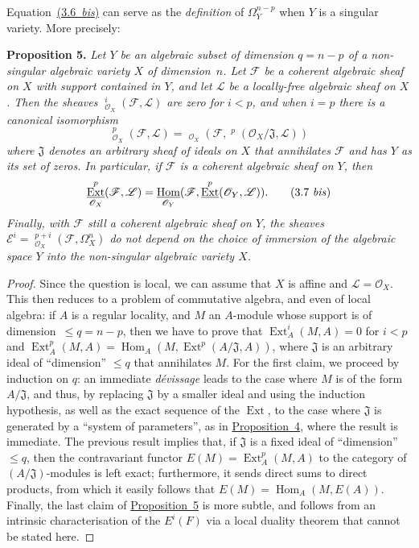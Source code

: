 \documentclass{article}
\newenvironment{itenv}[1]
  {\phantomsection\par\medskip\noindent\textbf{#1.}\itshape}
  {\par\medskip}
\newcommand{\scr}[1]{{\mathscr{#1}}}
\renewcommand{\leq}{\leqslant}
\DeclareMathOperator{\Ext}{Ext}
\DeclareMathOperator{\Hom}{Hom}
\DeclareMathOperator{\shExt}{\underline{Ext}}
\DeclareMathOperator{\shHom}{\underline{Hom}}
\newcommand{\oldpage}[1]{\marginpar{\footnotesize$\Big\vert$ \textit{p.~#1}}}
\begin{document}
Equation~\hyperref[3.6bis]{(3.6~\emph{bis})} can serve as the \emph{definition} of $\Omega_Y^{n-p}$ when $Y$ is a singular variety.
More precisely:

\begin{itenv}{Proposition 5}
\label{proposition5}
  Let $Y$ be an algebraic subset of dimension $q=n-p$ of a non-singular algebraic variety $X$ of dimension~$n$.
  Let $\scr{F}$ be a coherent algebraic sheaf on $X$ with support contained in $Y$, and let $\scr{L}$ be a locally-free algebraic sheaf on $X$.
  Then the sheaves $\shExt_{\scr{O}_X}^i(\scr{F},\scr{L})$ are zero for $i<p$, and when $i=p$ there is a canonical isomorphism
  \[
  \label{3.7}
    \shExt_{\scr{O}_X}^p(\scr{F},\scr{L}) = \shHom_{\scr{O}_X}(\scr{F},\shExt^p(\scr{O}_X/\mathfrak{J},\scr{L}))
  \tag{3.7}
  \]
  where $\mathfrak{J}$ denotes an arbitrary sheaf of ideals on $X$ that annihilates $\scr{F}$ and has $Y$ as its set of zeros.
  In particular, if $\scr{F}$ is a coherent algebraic sheaf on $Y$, then
  \[
  \label{3.7bis}
    \shExt_{\scr{O}_X}^p(\scr{F},\scr{L}) = \shHom_{\scr{O}_Y}(\scr{F},\shExt^p(\scr{O}_Y,\scr{L})).
  \tag{3.7 \emph{bis}}
  \]
  Finally, with $\scr{F}$ still a coherent algebraic sheaf on $Y$, the sheaves $\scr{E}^i=\shExt_{\scr{O}_X}^{p+i}(\scr{F},\Omega_X^n)$ do not depend on the choice of immersion of the algebraic space $Y$ into the non-singular algebraic variety $X$.
\end{itenv}

\begin{proof}
  Since the question is local, we can assume that $X$ is affine and $\scr{L}=\scr{O}_X$.
  This then reduces to a problem of commutative algebra, and even of local algebra:
  if $A$ is a regular locality, and $M$ an $A$-module whose support is of dimension~$\leq q=n-p$, then we have to prove that $\Ext_A^i(M,A)=0$ for $i<p$ and $\Ext_A^p(M,A)=\Hom_A(M,\Ext^p(A/\mathfrak{J},A))$, where $\mathfrak{J}$ is an arbitrary ideal of ``dimension'' $\leq q$ that annihilates $M$.
  For the first claim, we proceed by induction on $q$:
  an immediate \emph{d\'{e}vissage} leads to the case where $M$ is of the form $A/\mathfrak{J}$, and thus, by replacing $\mathfrak{J}$ by a smaller ideal and using the induction hypothesis, as well as the exact sequence of the $\Ext$, to the case where $\mathfrak{J}$ is generated by a ``system of parameters'', as in \hyperref[proposition4]{Proposition~4}, where the result is immediate.
  The previous result implies that, if $\mathfrak{J}$ is a
\oldpage{149-09}
  fixed ideal of ``dimension'' $\leq q$, then the contravariant functor $E(M)=\Ext_A^p(M,A)$ to the category of $(A/\mathfrak{J})$-modules is left exact;
  furthermore, it sends direct sums to direct products, from which it easily follows that $E(M)=\Hom_A(M,E(A))$.
  Finally, the last claim of \hyperref[proposition5]{Proposition~5} is more subtle, and follows from an intrinsic characterisation of the $E^i(F)$ via a local duality theorem that cannot be stated here.
\end{proof}
\end{document}
